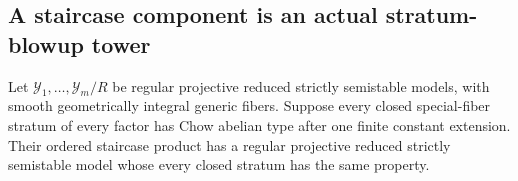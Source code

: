 \subsection{A staircase component is an actual stratum-blowup tower}

\begin{proposition}
\label{r20at:productstrata}
Let $\mathcal Y_1,\ldots,\mathcal Y_m/R$ be regular projective
reduced strictly semistable models, with smooth geometrically
integral generic fibers.  Suppose every closed special-fiber
stratum of every factor has Chow abelian type after one finite
constant extension.  Their ordered staircase product has a
regular projective reduced strictly semistable model whose every
closed stratum has the same property.
\end{proposition}

